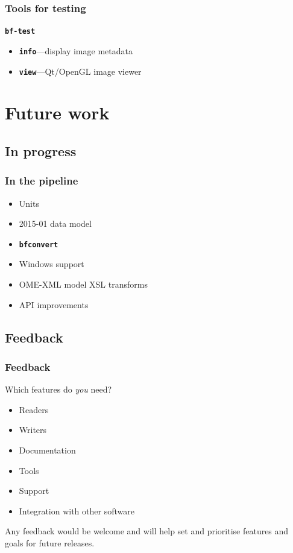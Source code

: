 \documentclass{beamer}
\newcommand{\cmd}[1]{\textbf{\texttt{#1}}}
\begin{document}
\begin{frame}
  \frametitle{Tools for testing}
  \begin{block}{\cmd{bf-test}}
    \begin{itemize}
      \item \cmd{info}---display image metadata
      \item \cmd{view}---Qt/OpenGL image viewer
    \end{itemize}
  \end{block}
\end{frame}

\section{Future work}
\subsection{In progress}

\begin{frame}
  \frametitle{In the pipeline}
  \begin{itemize}
  \item Units
  \item 2015-01 data model
  \item \cmd{bfconvert}
  \item Windows support
  \item OME-XML model XSL transforms
  \item API improvements
  \end{itemize}
\end{frame}

\subsection{Feedback}
\begin{frame}
  \frametitle{Feedback}
  Which features do \emph{you} need?

  \begin{itemize}
  \item Readers
  \item Writers
  \item Documentation
  \item Tools
  \item Support
  \item Integration with other software
  \end{itemize}

  Any feedback would be welcome and will help set and prioritise
  features and goals for future releases.
\end{frame}
\end{document}
